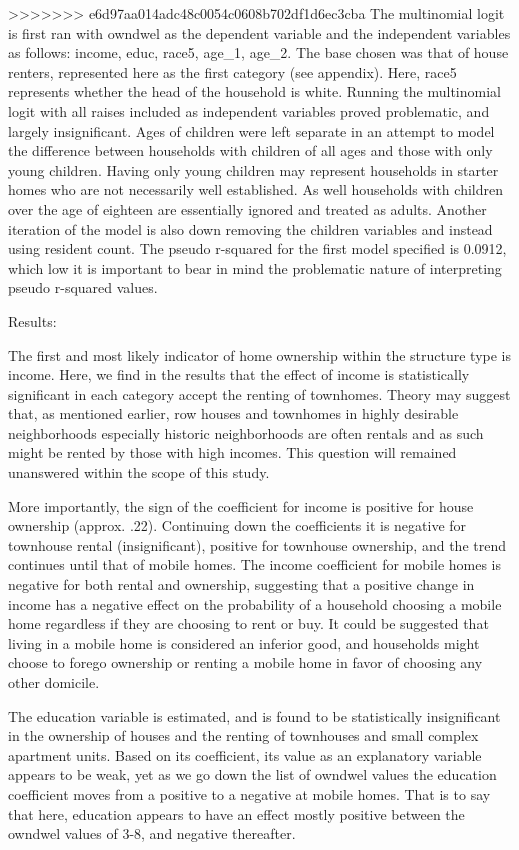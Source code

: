 \documentclass{article}
\begin{document}
>>>>>>> e6d97aa014adc48c0054c0608b702df1d6ec3cba
The multinomial logit is first ran with owndwel as the dependent variable and the independent variables as follows: income, educ, race5, age_1, age_2.  The base chosen was that of house renters, represented here as the first category (see appendix).  Here, race5 represents whether the head of the household is white.  Running the multinomial logit with all raises included as independent variables proved problematic, and largely insignificant.  Ages of children were left separate in an attempt to model the difference between households with children of all ages and those with only young children.  Having only young children may represent households in starter homes who are not necessarily well established.  As well households with children over the age of eighteen are essentially ignored and treated as adults.  Another iteration of the model is also down removing the children variables and instead using resident count.
The pseudo r-squared for the first model specified is 0.0912, which low it is important to bear in mind the problematic nature of interpreting pseudo r-squared values.  

Results:

The first and most likely indicator of home ownership within the structure type is income.  Here, we find in the results that the effect of income is statistically significant in each category accept the renting of townhomes.  Theory may suggest that, as mentioned earlier, row houses and townhomes in highly desirable neighborhoods especially historic neighborhoods are often rentals and as such might be rented by those with high incomes.  This question will remained unanswered within the scope of this study. 

 More importantly, the sign of the coefficient for income is positive for house ownership (approx. .22).  Continuing down the coefficients it is negative for townhouse rental (insignificant), positive for townhouse ownership, and the trend continues until that of mobile homes.  The income coefficient for mobile homes is negative for both rental and ownership, suggesting that a positive change in income has a negative effect on the probability of a household choosing a mobile home regardless if they are choosing to rent or buy.  It could be suggested that living in a mobile home is considered an inferior good, and households might choose to forego ownership or renting a mobile home in favor of choosing any other domicile.
 
The education variable is estimated, and is found to be statistically insignificant in the ownership of houses and the renting of townhouses and small complex apartment units.  Based on its coefficient, its value as an explanatory variable appears to be weak, yet as we go down the list of owndwel values the education coefficient moves from a positive to a negative at mobile homes. That is to say that here, education appears to have an effect mostly positive between the owndwel values of 3-8, and negative thereafter.
\end{document}
